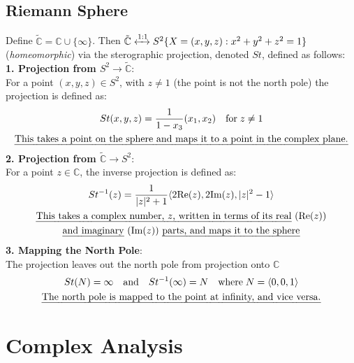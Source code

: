 \documentclass[a4paper, 10pt]{article}
\begin{document}
\subsection{Riemann Sphere}
Define $\tilde{\mathbb{C}} = \mathbb{C} \cup \{\infty\}$. Then
$\tilde{\mathbb{C}} \xleftrightarrow{1:1} S^2 \{X = (x,y,z) : x^2 + y^2 + z^2 = 1 \}$
(\emph{homeomorphic}) via the sterographic projection, denoted $St$, defined as follows:\\[2ex]
\textbf{1. Projection from $S^2 \to \tilde{\mathbb{C}}$}: \\
For a point $(x, y,z ) \in S^2$, with $z \neq 1$ (the point is not the north pole) the projection is defined as:
\begin{gather}
  St(x, y, z) = \frac{1}{1-x_3}(x_1, x_2) \quad \text{for} \; z \neq 1 \notag \\
  \text{\emph{This takes a point on the sphere and maps it to a point in the complex plane.}} \notag
\end{gather}
\textbf{2. Projection from $\tilde{\mathbb{C}} \to S^2$}: \\
For a point $z \in \mathbb{C}$, the inverse projection is defined as:
\begin{gather}
  St^{-1}(z) = \frac{1}{|z|^2 + 1}\langle 2\text{Re}(z), 2\text{Im}(z), |z|^2 - 1 \rangle \notag  \\
  \text{\emph{This takes a complex number, $z$, written in terms of its real} $($Re$(z))$} \notag \\
  \text{\emph{and imaginary} $($Im$(z))$ \emph{parts, and maps it to the sphere}} \notag
\end{gather}
\textbf{3. Mapping the North Pole}:
\\The projection leaves out the north pole from projection onto $\mathbb{C}$
\begin{gather}
  St(N)= \infty \quad \text{and} \quad St^{-1}(\infty) = N \notag \quad \text{where}\; N = \langle 0,0,1\rangle\\
  \text{\emph{The north pole is mapped to the point at infinity, and vice versa.}} \notag
\end{gather}

\pagebreak

\section{Complex Analysis}
\end{document}
